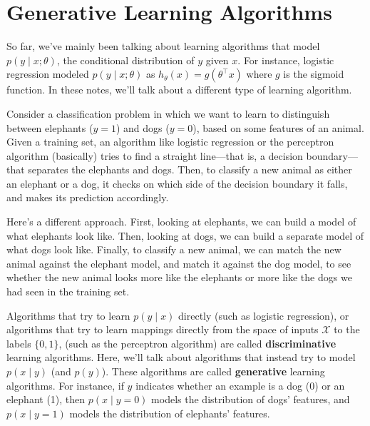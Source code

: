 \titlespacing*{\part}{0pt}{-20pt}{30pt} %
\titlespacing*{\chapter}{0pt}{-10pt}{30pt}

\part{Generative Learning Algorithms}
\label{part:generative_algs}


So far, we've mainly been talking about learning algorithms that model
$p(y \mid x;\theta)$, the conditional distribution of $y$ given $x$. For instance, logistic
regression modeled $p(y \mid x;\theta)$ as $h_\theta (x) = g(\theta^\top x)$ where $g$ is the sigmoid function.
In these notes, we'll talk about a different type of learning algorithm.

Consider a classification problem in which we want to learn to distinguish
between elephants ($y = 1$) and dogs ($y = 0$), based on some features of
an animal. Given a training set, an algorithm like logistic regression or
the perceptron algorithm (basically) tries to find a straight line---that is, a
decision boundary---that separates the elephants and dogs. Then, to classify
a new animal as either an elephant or a dog, it checks on which side of the
decision boundary it falls, and makes its prediction accordingly.

Here's a different approach. First, looking at elephants, we can build a
model of what elephants look like. Then, looking at dogs, we can build a
separate model of what dogs look like. Finally, to classify a new animal, we
can match the new animal against the elephant model, and match it against
the dog model, to see whether the new animal looks more like the elephants
or more like the dogs we had seen in the training set.

Algorithms that try to learn $p(y \mid x)$ directly (such as logistic regression),
or algorithms that try to learn mappings directly from the space of inputs $\mathcal X$
to the labels $\{0,1\}$, (such as the perceptron algorithm) are called \textbf{discriminative}
learning algorithms. Here, we'll talk about algorithms that instead
try to model $p(x \mid y)$ (and $p(y)$). These algorithms are called \textbf{generative}
learning algorithms. For instance, if $y$ indicates whether an example is a
dog (0) or an elephant (1), then $p(x \mid y = 0)$ models the distribution of dogs'
features, and $p(x \mid y = 1)$ models the distribution of elephants' features.

